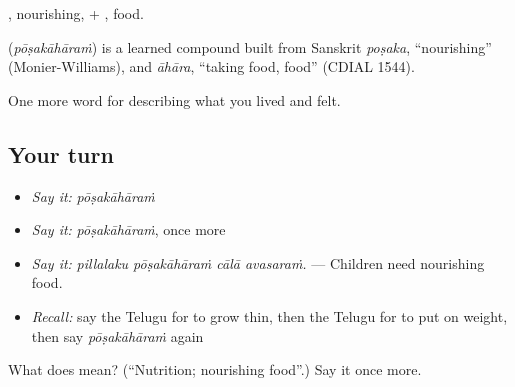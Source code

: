 , nourishing, + , food.

\begin{cousinweb}
\textbf{} (\emph{pōṣakāhāraṁ}) is a learned compound built from Sanskrit \emph{poṣaka}, \textquotedblleft{}nourishing\textquotedblright{} (Monier-Williams), and \emph{āhāra}, \textquotedblleft{}taking food, food\textquotedblright{} (CDIAL 1544).
\end{cousinweb}

\begin{grammarlens}[title={What you've built}]
One more word for describing what you lived and felt.
\end{grammarlens}

\subsection*{Your turn}
\begin{itemize}
\raggedright
  \item \emph{Say it:} \emph{pōṣakāhāraṁ}
  \item \emph{Say it:} \emph{pōṣakāhāraṁ}, once more
  \item \emph{Say it:} \emph{pillalaku pōṣakāhāraṁ cālā avasaraṁ.} — Children need nourishing food.
  \item \emph{Recall:} say the Telugu for to grow thin, then the Telugu for to put on weight, then say \emph{pōṣakāhāraṁ} again
\end{itemize}

\begin{tcolorbox}[breakable,colback=teal!4,colframe=teal!35!black,title={Before you move on}]
What does  mean? (\textquotedblleft{}Nutrition; nourishing food\textquotedblright{}.) Say it once more.
\end{tcolorbox}
